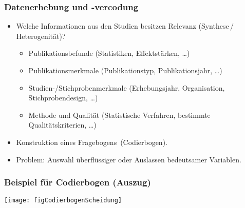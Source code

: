 \begin{frame}
  \frametitle{Datenerhebung und -vercodung}
  \begin{itemize}[<+->]
  \item Welche Informationen aus den Studien besitzen Relevanz (Synthese\,/\,Heterogenität)?
    \begin{itemize}
    \item Publikationsbefunde (Statistiken, Effektstärken, \ldots)
    \item Publikationsmerkmale (Publikationstyp, Publikationsjahr, \ldots)
    \item Studien-/Stichprobenmerkmale (Erhebungsjahr, Organisation, Stichprobendesign, \ldots)
    \item Methode und Qualität (Statistische Verfahren, bestimmte Qualitätskriterien, \ldots)
    \end{itemize}
  \item Konstruktion eines \glq Fragebogens\grq\ (Codierbogen).
  \item Problem: Auswahl überflüssiger oder Auslassen bedeutsamer Variablen.
  \end{itemize}
\end{frame}






\begin{frame}
  \frametitle{Beispiel für Codierbogen (Auszug)}
  \texttt{[image: figCodierbogenScheidung]}
\end{frame}


